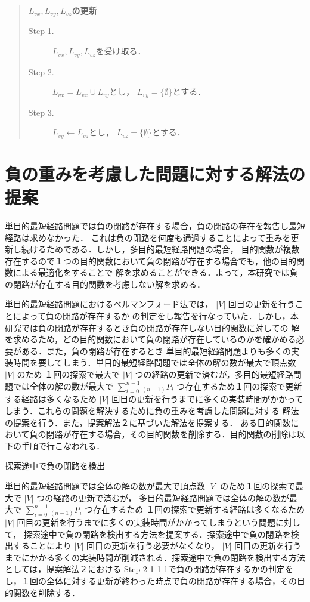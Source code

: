\documentclass[12pt]{optlab-bachelor}
\begin{document}
\begin{quote}
  \textbf{$L_{vx},L_{vy},L_{vz}$の更新}
  \begin{description}
    \item[Step 1.] $L_{vx},L_{vy},L_{vz}$を受け取る．
    \item[Step 2.] $L_{vx} = L_{vx} \cup L_{vy}$とし，
    $L_{vy} = \{ \emptyset \}$とする．
    \item[Step 3.] $L_{vy} \leftarrow L_{vz}$とし，
    $L_{vz} = \{ \emptyset \}$とする．
  \end{description}
\end{quote}


\section{負の重みを考慮した問題に対する解法の提案}

単目的最短経路問題では負の閉路が存在する場合，負の閉路の存在を報告し最短経路は求めなかった．
これは負の閉路を何度も通過することによって重みを更新し続けるためである．しかし，多目的最短経路問題の場合，
目的関数が複数存在するので１つの目的関数において負の閉路が存在する場合でも，他の目的関数による最適化をすることで
解を求めることができる．よって，本研究では負の閉路が存在する目的関数を考慮しない解を求める．

単目的最短経路問題におけるベルマンフォード法では， $|V|$ 回目の更新を行うことによって負の閉路が存在するか
の判定をし報告を行なっていた．しかし，本研究では負の閉路が存在するとき負の閉路が存在しない目的関数に対しての
解を求めるため，どの目的関数において負の閉路が存在しているのかを確かめる必要がある．また，負の閉路が存在するとき
単目的最短経路問題よりも多くの実装時間を要してしまう．単目的最短経路問題では全体の解の数が最大で頂点数 $|V|$ のため
１回の探索で最大で $|V|$ つの経路の更新で済むが，多目的最短経路問題では全体の解の数が最大で
 $\displaystyle \sum_{i=0}^{n-1} {}_{(n-1)}P_i$ つ存在するため１回の探索で更新する経路は多くなるため
 $|V|$ 回目の更新を行うまでに多くの実装時間がかかってしまう．これらの問題を解決するために負の重みを考慮した問題に対する
解法の提案を行う．また，提案解法２に基づいた解法を提案する．
ある目的関数において負の閉路が存在する場合，その目的関数を削除する．目的関数の削除は以下の手順で行こなわれる．

\begin{description}
  \item[探索途中で負の閉路を検出]
\end{description}

単目的最短経路問題では全体の解の数が最大で頂点数 $|V|$ のため１回の探索で最大で $|V|$ つの経路の更新で済むが，
多目的最短経路問題では全体の解の数が最大で $\displaystyle \sum_{i=0}^{n-1} {}_{(n-1)}P_i$ つ存在するため
１回の探索で更新する経路は多くなるため $|V|$ 回目の更新を行うまでに多くの実装時間がかかってしまうという問題に対して，
探索途中で負の閉路を検出する方法を提案する．探索途中で負の閉路を検出することにより $|V|$ 回目の更新を行う必要がなくなり，
 $|V|$ 回目の更新を行うまでにかかる多くの実装時間が削減される．探索途中で負の閉路を検出する方法としては，提案解法２における
Step 2-1-1-1で負の閉路が存在するかの判定をし，１回の全体に対する更新が終わった時点で負の閉路が存在する場合，その目的関数を削除する．
\end{document}
